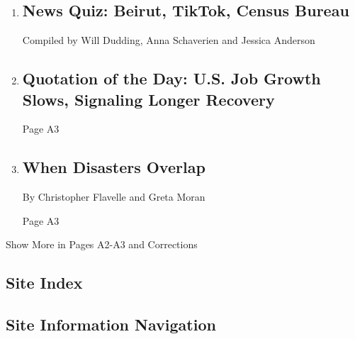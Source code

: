 \begin{enumerate}
\def\labelenumi{\arabic{enumi}.}
\item
  \href{/interactive/2020/08/07/briefing/beirut-tiktok-census-bureau-news-quiz.html}{}

  \hypertarget{news-quiz-beirut-tiktok-census-bureau}{%
  \subsection{News Quiz: Beirut, TikTok, Census
  Bureau}\label{news-quiz-beirut-tiktok-census-bureau}}

  Compiled by Will Dudding, Anna Schaverien and Jessica Anderson
\item
  \href{/2020/08/07/todayspaper/quotation-of-the-day-us-job-growth-slows-signaling-longer-recovery.html}{}

  \hypertarget{quotation-of-the-day-us-job-growth-slows-signaling-longer-recovery}{%
  \subsection{Quotation of the Day: U.S. Job Growth Slows, Signaling
  Longer
  Recovery}\label{quotation-of-the-day-us-job-growth-slows-signaling-longer-recovery}}

  Page A3
\item
  \href{/2020/08/05/climate/overlapping-disasters-heat.html}{}

  \hypertarget{when-disasters-overlap}{%
  \subsection{When Disasters Overlap}\label{when-disasters-overlap}}

  By Christopher Flavelle and Greta Moran

  Page A3
\end{enumerate}

Show More in Pages A2-A3 and Corrections

\hypertarget{site-index}{%
\subsection{Site Index}\label{site-index}}

\hypertarget{site-information-navigation}{%
\subsection{Site Information
Navigation}\label{site-information-navigation}}

